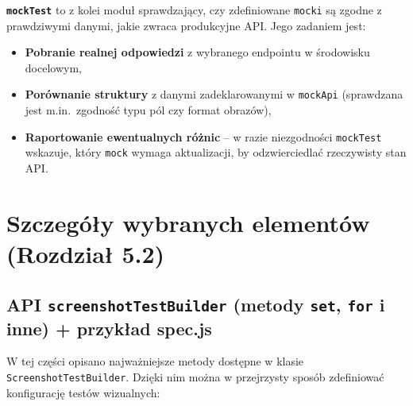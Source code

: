 \documentclass[12pt]{report}
\begin{document}
\noindent \textbf{\texttt{mockTest}} to z kolei moduł sprawdzający, czy zdefiniowane \texttt{mocki} są zgodne z prawdziwymi danymi, jakie zwraca produkcyjne API. Jego zadaniem jest:
\begin{itemize}
   \item \textbf{Pobranie realnej odpowiedzi} z wybranego endpointu w środowisku docelowym,
   \item \textbf{Porównanie struktury} z danymi zadeklarowanymi w \texttt{mockApi} (sprawdzana jest m.in.~zgodność typu pól czy format obrazów),
   \item \textbf{Raportowanie ewentualnych różnic} -- w razie niezgodności \texttt{mockTest} wskazuje, który \texttt{mock} wymaga aktualizacji, by odzwierciedlać rzeczywisty stan API.
\end{itemize}


\section{Szczegóły wybranych elementów (Rozdział 5.2)}
\label{sec:szczegoly-wybranych-elementow}

\subsection{API \texttt{screenshotTestBuilder} (metody \texttt{set}, \texttt{for} i inne) + przykład spec.js}
\label{sec:api-screenshotTestBuilder}
W tej części opisano najważniejsze metody dostępne w klasie \texttt{ScreenshotTestBuilder}. Dzięki nim można w przejrzysty sposób zdefiniować konfigurację testów wizualnych:
\end{document}
